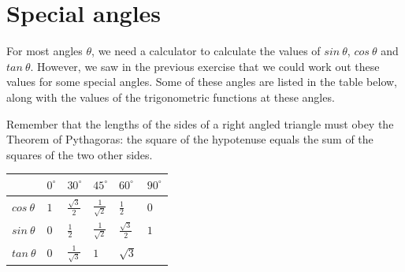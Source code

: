 \section{Special angles}
For most angles $\theta $, we need a calculator to calculate the values of $sin~\theta $, $cos~\theta $ and $tan~\theta $. However, we saw in the previous exercise that we could work out these values for some special angles. Some of these angles are listed in the table below, along with the values of the trigonometric functions at these angles. \par
Remember that the lengths of the sides of a right angled triangle must obey the Theorem of Pythagoras: the square of the hypotenuse equals the sum of the squares of the two other sides.\par 
\begin{table}[H]
\begin{center}

\begin{tabular}{|l|l|l|l|l|l|}\hline
&
${0}^{\circ }$
&
${30}^{\circ }$
&
${45}^{\circ }$
&
${60}^{\circ }$
&
${90}^{\circ }$

\\ \hline
$cos~\theta $
&
$1$ &
$\frac{\sqrt{3}}{2}$
&
$\frac{1}{\sqrt{2}}$
&
$\frac{1}{2}$
&
$0 $

\\ \hline
$sin~\theta $
&
$0$ &
$\frac{1}{2}$
&
$\frac{1}{\sqrt{2}}$
&
$\frac{\sqrt{3}}{2}$
&
$1$ 
\\ \hline
$tan~\theta $
&
$0$ &
$\frac{1}{\sqrt{3}}$
&
$1$ &
$\sqrt{3}$
&


\\ \hline
\end{tabular}
\end{center}
\end{table}
